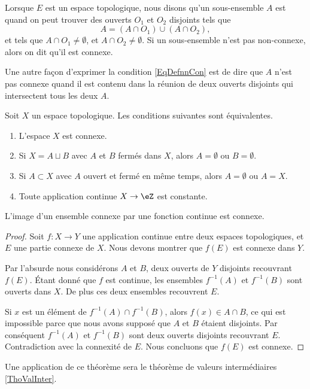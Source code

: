 \begin{definition}  \label{DefIRKNooJJlmiD}
     Lorsque $E$ est un espace topologique, nous disons qu'un sous-ensemble $A$ est  quand on peut trouver des ouverts $O_1$ et $O_2$ disjoints tels que
    \begin{equation}    \label{EqDefnnCon}
        A=(A\cap O_1)\cup (A\cap O_2),
    \end{equation}
    et tels que $A\cap O_1\neq\emptyset$, et $A\cap O_2\neq\emptyset$. Si un sous-ensemble n'est pas non-connexe, alors on dit qu'il est connexe.
\end{definition}
Une autre façon d'exprimer la condition \eqref{EqDefnnCon} est de dire que $A$ n'est pas connexe quand il est contenu dans la réunion de deux ouverts disjoints qui intersectent tous les deux $A$.

\begin{proposition} \label{PropHSjJcIr}
    Soit \( X\) un espace topologique. Les conditions suivantes sont équivalentes.
    \begin{enumerate}
        \item
            L'espace \( X\) est connexe.
        \item
            Si \( X=A\sqcup B\) avec \( A\) et \( B\) fermés dans \( X\), alors \( A=\emptyset\) ou \( B=\emptyset\).
        \item
            Si \( A\subset X\) avec \( A\) ouvert et fermé en même temps, alors \( A=\emptyset\) ou \( A=X\).
        \item
            Toute application continue \( X\to \eZ\) est constante.
    \end{enumerate}
\end{proposition}

\begin{proposition}\label{PropGWMVzqb}
    L'image d'un ensemble connexe par une fonction continue est connexe.
\end{proposition}

\begin{proof}
    Soit \( f\colon X\to Y\) une application continue entre deux espaces topologiques, et \( E\) une partie connexe de \( X\). Nous devons montrer que \( f(E)\) est connexe dans \( Y\).

    Par l'absurde nous considérons \( A\) et \( B\), deux ouverts de \( Y\) disjoints recouvrant \( f(E)\). Étant donné que \( f\) est continue, les ensembles \( f^{-1}(A)\) et \( f^{-1}(B)\) sont ouverts dans \( X\). De plus ces deux ensembles recouvrent \( E\).

    Si \( x\) est un élément de \( f^{-1}(A)\cap f^{-1}(B)\), alors \( f(x)\in A\cap B\), ce qui est impossible parce que nous avons supposé que \( A\) et \( B\) étaient disjoints. Par conséquent \( f^{-1}(A)\) et \( f^{-1}(B)\) sont deux ouverts disjoints recouvrant \( E\). Contradiction avec la connexité de \( E\). Nous concluons que \( f(E)\) est connexe.
\end{proof}
Une application de ce théorème sera le théorème de valeurs intermédiaires \ref{ThoValInter}.


